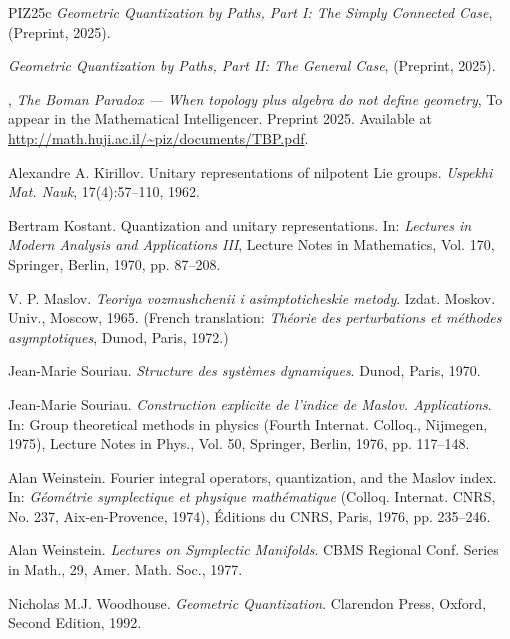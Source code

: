 \documentclass[10pt,reqno,letterpaper,twoside]{amsbook}
\begin{document}
\begin{thebibliography}{PIZ25c}
    \bysame %
    \emph{Geometric Quantization by Paths, Part I: The Simply Connected Case},
    (Preprint, 2025).
    
    \bysame %
    \emph{Geometric Quantization by Paths, Part II: The General Case},
    (Preprint, 2025).
    
    \bysame,
    \emph{The Boman Paradox --- When topology plus algebra do not define geometry},
    To appear in the Mathematical Intelligencer. Preprint 2025. Available at \url{http://math.huji.ac.il/~piz/documents/TBP.pdf}.
    
    Alexandre A. Kirillov.
    Unitary representations of nilpotent Lie groups.
    {\em Uspekhi Mat. Nauk}, 17(4):57--110, 1962.
    
    Bertram Kostant.
    Quantization and unitary representations.
    In: {\em Lectures in Modern Analysis and Applications III},
    Lecture Notes in Mathematics, Vol. 170,
    Springer, Berlin, 1970, pp. 87--208.
    
    V. P. Maslov.
    {\em Teoriya vozmushchenii i asimptoticheskie metody}.
    Izdat. Moskov. Univ., Moscow, 1965.
    (French translation: {\em Th\'eorie des perturbations et m\'ethodes asymptotiques}, Dunod, Paris, 1972.)
    
    Jean-Marie Souriau.
    {\em Structure des syst\`emes dynamiques}.
    Dunod, Paris, 1970.
    
    Jean-Marie Souriau.
    \newblock \emph{Construction explicite de l'indice de Maslov. Applications}.
    \newblock In: Group theoretical methods in physics (Fourth Internat. Colloq., Nijmegen, 1975), Lecture Notes in Phys., Vol. 50, Springer, Berlin, 1976, pp. 117--148.
    
    Alan Weinstein.
    Fourier integral operators, quantization, and the Maslov index.
    In: {\em G\'eom\'etrie symplectique et physique math\'ematique}
    (Colloq. Internat. CNRS, No. 237, Aix-en-Provence, 1974),
    \'Editions du CNRS, Paris, 1976, pp. 235--246.
    
    Alan Weinstein.
    \emph{Lectures on Symplectic Manifolds}.
    CBMS Regional Conf. Series in Math., 29, Amer. Math. Soc., 1977.
    
    Nicholas M.J. Woodhouse.
    \emph{Geometric Quantization}.
    Clarendon Press, Oxford, Second Edition, 1992.
    
  \end{thebibliography}
  
\end{document}
